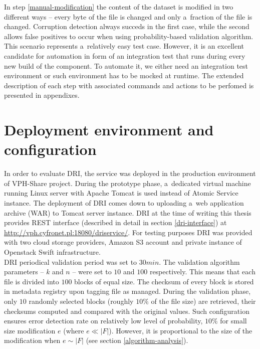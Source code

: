 In step \ref{manual-modification} the content of the dataset
is modified in two different ways -- every byte of the file is changed and only a~fraction of
the file is changed. Corruption detection always succeds in the first case, while the second
allows false positives to occur when using probability-based validation algorithm.\\

This scenario represents a~relatively easy test case. However, it is an excellent candidate for
automation in form of an integration test that runs during every new build of the component.
To automate it, we either need an integration test environment or such environment has to be
mocked at runtime. The extended description of each step with associated commands and actions
to be perfomed is presented in appendixes. 

\section{Deployment environment and configuration}

In order to evaluate DRI, the service was deployed in the production environment
of VPH-Share project. During the prototype phase, a~dedicated virtual machine running Linux
server with Apache Tomcat is used instead of Atomic Service instance. The deployment
of DRI comes down to uploading a~web application archive (WAR) to Tomcat server
instance. DRI at the time of writing this thesis provides REST interface (described
in detail in section \ref{dri-interface}) at \url{http://vph.cyfronet.pl:18080/driservice/}.
For testing purposes DRI was provided with two cloud storage providers, Amazon S3 account
and private instance of Openstack Swift infrastructure.\\

DRI periodical validation period was set to $30 min$. The validation algorithm parameters --
$k$ and $n$ -- were set to $10$ and $100$ respectively. This means that each file is divided
into $100$ blocks of equal size. The checksum of every block is stored in metadata registry
upon tagging file as managed. During the validation phase, only $10$ randomly selected blocks
(roughly $10 \%$ of the file size) are retrieved, their checksums computed and compared
with the original values. Such configuration ensures error detection rate on relatively low
level of probability, $10 \%$ for small size modification $e$ (where $e \ll |F|$). However, it is
proportional to the size of the modification when $e \sim |F|$ (see section \ref{algorithm-analysis}).


